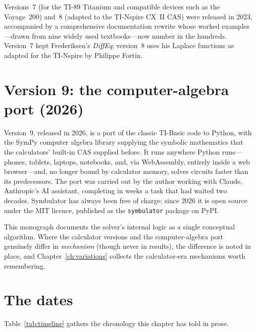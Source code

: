 \documentclass[11pt,oneside]{report}
\newcommand{\code}[1]{\texttt{#1}}
\begin{document}
Versions~7 (for the TI-89 Titanium and compatible devices such as the
Voyage~200) and~8 (adapted to the TI-Nspire CX~II CAS) were released
in 2023, accompanied by a comprehensive documentation rewrite whose
worked examples---drawn from nine widely used textbooks---now number
in the hundreds. Version~7 kept Frederiksen's \emph{DiffEq};
version~8 uses his Laplace functions as adapted for the TI-Nspire by
Philippe Fortin.

\section{Version 9: the computer-algebra port (2026)}

Version~9, released in 2026, is a port of the classic TI-Basic code to
Python, with the SymPy computer algebra library supplying the symbolic
mathematics that the calculators' built-in CAS supplied before. It
runs anywhere Python runs---phones, tablets, laptops, notebooks, and,
via WebAssembly, entirely inside a web browser---and, no longer bound
by calculator memory, solves circuits faster than its predecessors.
The port was carried out by the author working with Claude,
Anthropic's AI assistant, completing in weeks a task that had waited
two decades. Symbulator has always been free of charge; since 2026 it
is open source under the MIT licence, published as the
\code{symbulator} package on PyPI.

This monograph documents the solver's internal logic as a single
conceptual algorithm. Where the calculator versions and the
computer-algebra port genuinely differ in \emph{mechanism} (though
never in results), the difference is noted in place, and
Chapter~\ref{ch:variations} collects the calculator-era mechanisms
worth remembering.

\section{The dates}

Table~\ref{tab:timeline} gathers the chronology this chapter has told
in prose.
\end{document}
